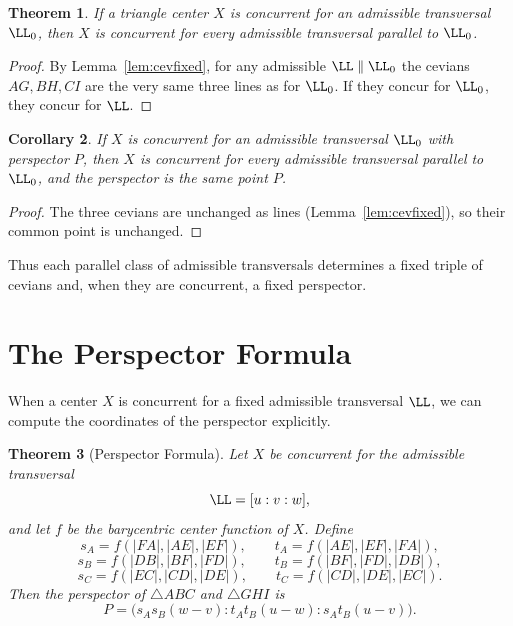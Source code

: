 \documentclass[12pt,a4paper]{amsart}
\newtheorem{theorem}{Theorem} [section]
\newtheorem{corollary}[theorem]{Corollary}
\theoremstyle{remark}
\begin{document}
\begin{theorem}\label{thm:direction}
If a triangle center $X$ is concurrent for an admissible transversal $\LL_0$,
then $X$ is concurrent for every admissible transversal parallel to $\LL_0$.
\end{theorem}

\begin{proof}
By Lemma~\ref{lem:cevfixed}, for any admissible $\LL\parallel\LL_0$ the cevians
$AG,BH,CI$ are the very same three lines as for $\LL_0$. If they concur for
$\LL_0$, they concur for $\LL$.
\end{proof}

\begin{corollary}\label{cor:perspfixed}
If $X$ is concurrent for an admissible transversal $\LL_0$ with perspector $P$,
then $X$ is concurrent for every admissible transversal parallel to $\LL_0$, and
the perspector is the same point $P$.
\end{corollary}

\begin{proof}
The three cevians are unchanged as lines (Lemma~\ref{lem:cevfixed}), so their
common point is unchanged.
\end{proof}

Thus each parallel class of admissible transversals determines a fixed triple of
cevians and, when they are concurrent, a fixed perspector.

\section{The Perspector Formula}

When a center $X$ is concurrent for a fixed admissible transversal $\LL$, we can
compute the coordinates of the perspector explicitly.

\begin{theorem}[Perspector Formula]
\label{thm:perspformula}
Let $X$ be concurrent for the admissible transversal
\[
\LL=[u:v:w],
\]
and let $f$ be the barycentric center function of $X$.  Define
\[
s_A=f(|FA|,|AE|,|EF|),\qquad
t_A=f(|AE|,|EF|,|FA|),
\]
\[
s_B=f(|DB|,|BF|,|FD|),\qquad
t_B=f(|BF|,|FD|,|DB|),
\]
\[
s_C=f(|EC|,|CD|,|DE|),\qquad
t_C=f(|CD|,|DE|,|EC|).
\]
Then the perspector of $\triangle ABC$ and $\triangle GHI$ is
\[
P=
\bigl(
s_As_B(w-v):
t_At_B(u-w):
s_At_B(u-v)
\bigr).
\]
\end{theorem}
\end{document}
